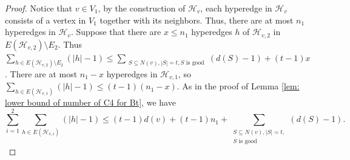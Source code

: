 \documentclass[10pt,a4paper]{amsart}
\begin{document}
\begin{proof}
            Notice that $v \in V_1$,
            by the construction of $\mathcal{H}_v$, each hyperedge in $\mathcal{H}_v$ consists of a vertex in $V_1$ together with its neighbors.
            Thus, there are at most $n_1$ hyperedges in $\mathcal{H}_v$.
            Suppose that there are $x \leq n_1$ hyperedges $h$ of $\mathcal{H}_{v, 2}$ in $E(\mathcal{H}_{v, 2}) \setminus E_2$.
            Thus $\sum_{h \in E(\mathcal{H}_{v, 2}) \setminus E_2} (|h| - 1)  \leq  \sum_{\substack{S \subseteq N(v), |S| = t, S \text{ is good}}} (d(S) - 1) + (t-1)x$.
            There are at most $n_1-x$ hyperedges in $\mathcal{H}_{v, 1}$, so $\sum_{h \in E(\mathcal{H}_{v, 1})} (|h| - 1) \leq (t-1)(n_1 - x)$.
            As in the proof of Lemma \ref{lem: lower bound of number of C4 for Bt}, we have
            \begin{equation}\label{eq: lem2.2 2}
                \sum_{i = 1}^{2} \sum_{h \in E(\mathcal{H}_{v, i})} (|h| - 1) \leq (t-1)d(v) + (t-1)n_1 + \sum_{\substack{S \subseteq N(v), |S| = t, \\ S \text{ is good}}} (d(S) - 1).
            \end{equation}


\end{proof}
\end{document}
